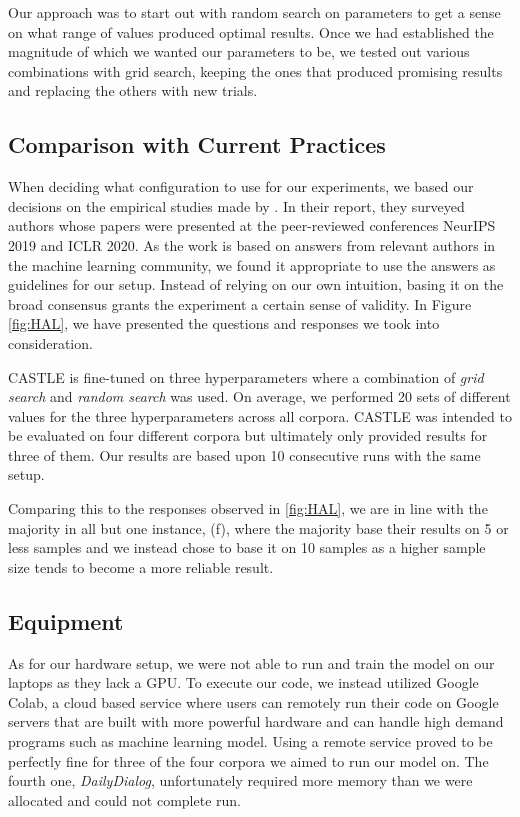 \documentclass[nofilelist]{cslthse-msc}
\begin{document}
Our approach was to start out with random search on parameters to get a sense on what range of values produced optimal results. Once we had established the magnitude of which we wanted our parameters to be, we tested out various combinations with grid search, keeping the ones that produced promising results and replacing the others with new trials.


\subsection{Comparison with Current Practices}
When deciding what configuration to use for our experiments, we based our decisions on the empirical studies made by  \citet{bouthillier:hal-02447823}. In their report, they surveyed authors whose papers were presented at the peer-reviewed conferences NeurIPS 2019 and ICLR 2020. As the work is based on answers from relevant authors in the machine learning community, we found it appropriate to use the answers as guidelines for our setup. Instead of relying on our own intuition, basing it on the broad consensus grants the experiment a certain sense of validity. In Figure \ref{fig:HAL}, we have presented the questions and responses we took into consideration.

CASTLE is fine-tuned on three hyperparameters where a combination of \textit{grid search} and \textit{random search} was used. On average, we performed 20 sets of different values for the three hyperparameters across all corpora. CASTLE was intended to be evaluated on four different corpora but ultimately only provided results for three of them. Our results are based upon 10 consecutive runs with the same setup. 

Comparing this to the responses observed in \ref{fig:HAL}, we are in line with the majority in all but one instance, (f), where the majority base their results on 5 or less samples and we instead chose to base it on 10 samples as a higher sample size tends to become a more reliable result.

\subsection{Equipment}
As for our hardware setup, we were not able to run and train the model on our laptops as they lack a GPU. To execute our code, we instead utilized Google Colab, a cloud based service where users can remotely run their code on Google servers that are built with more powerful hardware and can handle high demand programs such as machine learning model. Using a remote service proved to be perfectly fine for three of the four corpora we aimed to run our model on. The fourth one, \textit{DailyDialog}, unfortunately required more memory than we were allocated and could not complete run.
\end{document}
